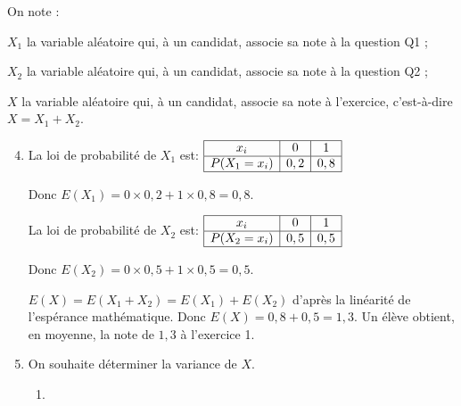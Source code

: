 \documentclass[10pt]{article}
\begin{document}
\begin{list}{\textbullet}{On note :}
		\item $X_{1}$ la variable aléatoire qui, à un candidat, associe sa note à la question Q1 ;
		\item $X_{2}$ la variable aléatoire qui, à un candidat, associe sa note à la question Q2 ;
		\item $X$ la variable aléatoire qui, à un candidat, associe sa note à l'exercice, c'est-à-dire $X = X_{1} + X_{2}$.
\end{list}

\begin{enumerate}
\setcounter{enumi}{3}

\item La loi de probabilité de $X_1$ est:\hspace{2cm}
$\begin{array}{|c|c|c|}
\hline
x_i & 0 & 1\\
\hline
P(X_1=x_i) & 0,2 & 0,8\\
\hline
\end{array}$

Donc $E(X_1)= 0\times 0,2 + 1\times 0,8=0,8$.

La loi de probabilité de $X_2$ est:\hspace{2cm}
$\begin{array}{|c|c|c|}
\hline
x_i & 0 & 1\\
\hline
P(X_2=x_i) & 0,5 & 0,5\\
\hline
\end{array}$

Donc $E(X_2)= 0\times 0,5 + 1\times 0,5 =0,5$.

$E(X)=E(X_1+X_2)=E(X_1)+E(X_2)$ d'après la linéarité de l'espérance mathématique.
Donc $E(X)=0,8+0,5=1,3$. Un élève obtient, en moyenne, la note de $1,3$ à l'exercice 1.

\item On souhaite déterminer la variance de $X$.

	\begin{enumerate}
		\item 
{}


\end{enumerate}
\end{enumerate}
\end{document}
